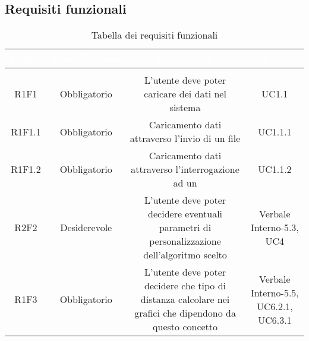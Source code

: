 \subsection{Requisiti funzionali}
\renewcommand{\arraystretch}{1.5}
\begin{center}
\begin{longtable}{C{\colA} C{\colB} C{\colC} C{\colA}}
		\textcolor{white}{\textbf{Codice}} & 
		\textcolor{white}{\textbf{Classificazione}} & 
		\textcolor{white}{\textbf{Descrizione}} & 
		\textcolor{white}{\textbf{Fonti}} \\
		\endfirsthead
	    \\
	    \endfoot
	    \caption{Tabella dei requisiti funzionali}
	    \endlastfoot

R1F1 & Obbligatorio & L'utente deve poter caricare dei dati nel sistema & UC1.1\\
R1F1.1 & Obbligatorio & Caricamento dati attraverso l'invio di un file  & UC1.1.1\\
R1F1.2 & Obbligatorio & Caricamento dati attraverso l'interrogazione ad un  & UC1.1.2\\

R2F2 & Desiderevole & L'utente deve poter decidere eventuali parametri di personalizzazione dell'algoritmo scelto & Verbale Interno-5.3, UC4\\

R1F3 & Obbligatorio & L'utente deve poter decidere che tipo di distanza calcolare nei grafici che dipendono da questo concetto & Verbale Interno-5.5, UC6.2.1, UC6.3.1\\


\end{longtable}
\end{center}
